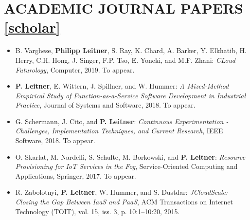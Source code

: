 \documentclass[paper=letter,fontsize=11pt]{scrartcl} %
\newcommand{\NewPart}[2]{\section*{\uppercase{#1} #2}}
\begin{document}
\newpage


\NewPart{Academic Journal Papers}{\href{https://scholar.google.ch/citations?user=wZ9f8CAAAAAJ}{[scholar]}}

\begin{itemize}
	\item  B. Varghese, \textbf{Philipp Leitner}, S. Ray, K. Chard, A. Barker, Y. Elkhatib, H. Herry, C.H. Hong, J. Singer, F.P. Tso, E. Yoneki, and M.F. Zhani: \emph{CLoud Futurology}, Computer, 2019. To appear.
	\item \textbf{P. Leitner}, E. Wittern, J. Spillner, and W. Hummer: \emph{A Mixed-Method Empirical Study of Function-as-a-Service Software Development in Industrial Practice}, Journal of Systems and Software, 2018. To appear.
	\item  G. Schermann, J. Cito, and \textbf{P. Leitner}: \emph{Continuous Experimentation - Challenges, Implementation Techniques, and Current Research}, IEEE Software, 2018. To appear.
	\item  O. Skarlat, M. Nardelli, S. Schulte, M. Borkowski, and \textbf{P. Leitner}: \emph{Resource Provisioning for IoT Services in the Fog}, Service-Oriented Computing and Applications, Springer, 2017. To appear.
  \item  R. Zabolotnyi, \textbf{P. Leitner}, W. Hummer, and S. Dustdar: \emph{JCloudScale: Closing the Gap Between IaaS and PaaS}, ACM Transactions on Internet Technology (TOIT),  vol. 15, iss. 3, p. 10:1–10:20, 2015.

\end{itemize}
\end{document}
